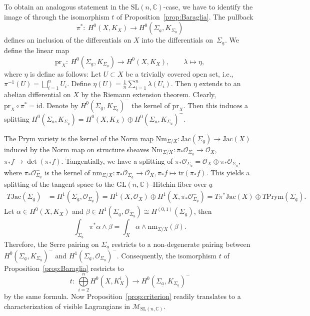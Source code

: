 \documentclass[10pt,a4paper]{amsart}
\numberwithin{equation}{section}
\theoremstyle{definition}
\newcommand{\reg}{\mathrm{reg}}
\newcommand{\Jac}{\mathrm{Jac}}
\renewcommand{\to}{\rightarrow}
\newcommand{\calB}{\mathcal{B}}
\newcommand{\calM}{\mathcal{M}}
\newcommand{\calO}{\mathcal{O}}
\newcommand{\CC}{\mathbb{C}}
\newcommand{\id}{\mathrm{id}}
\newcommand{\tr}{\mathrm{tr}}
\newcommand{\Prym}{\mathrm{Prym}}
\newcommand{\Nm}{\mathrm{Nm}}
\newcommand{\GL}{\mathrm{GL}}
\newcommand{\SL}{\mathrm{SL}}
\begin{document}
To obtain an analogous statement in the $\SL(n,\CC)$-case, we have to identify the image of \smash{$T\calB^{\reg}_{\SL(n,\CC)} \subset T\calB^{\reg}_{\GL(n,\CC)}$} through the isomorphism $t$ of Proposition~\ref{prop:Baraglia}. The pullback
\[ \pi^*\colon \ H^0(X,K_X) \rightarrow H^0({\Sigma_{\underline{a}}},K_{\Sigma_{\underline{a}}})
\]
defines an inclusion of the differentials on $X$ into the differentials on~${\Sigma_{\underline{a}}}$. We define the linear map
\[ \mathrm{pr}_X\colon \ H^0({\Sigma_{\underline{a}}},K_{\Sigma_{\underline{a}}}) \to H^0(X,K_X), \qquad \lambda \mapsto \eta,
\]
where $\eta$ is define as follows: Let $U \subset X$ be a trivially covered open set, i.e., $\pi^{-1}(U)=\bigsqcup_{i=1}^n U_i$. Define $\eta(U)= \frac1n \sum_{i=1}^n \lambda(U_i)$. Then $\eta$ extends to an abelian differential on $X$ by the Riemann extension theorem. Clearly, $\mathrm{pr}_X \circ \pi^*=\id$. Denote by $H^0({\Sigma_{\underline{a}}},K_{\Sigma_{\underline{a}}})^-$ the kernel of $\mathrm{pr}_X$. Then this induces a splitting $H^0({\Sigma_{\underline{a}}},K_{\Sigma_{\underline{a}}})=H^0(X,K_X) \oplus H^0({\Sigma_{\underline{a}}}, K_{\Sigma_{\underline{a}}})^-$.


The Prym variety is the kernel of the Norm map $\Nm_{\Sigma/X}\colon \Jac(\Sigma_{\underline{a}}) \to \Jac(X)$ induced by the Norm map on structure sheaves $\Nm_{\Sigma/X}\colon \pi_*\calO_{\Sigma_{\underline{a}}} \to \calO_X$, $\pi_*f \to \det(\pi_*f)$. Tangentially, we have a splitting of $\pi_*\calO_{\Sigma_{\underline{a}}}= \calO_X \oplus \pi_*\calO_{\Sigma_{\underline{a}}}^-$, where $\pi_*\calO_{\Sigma_{\underline{a}}}^-$ is the kernel of $\mathrm{nm}_{\Sigma/X}\colon \pi_* \calO_{\Sigma_{\underline{a}}} \to \calO_X, \pi_*f \mapsto \tr(\pi_*f)$. This yields a splitting of the tangent space to the $\GL(n,\CC)$-Hitchin fiber over $\underline{a}$
\begin{align*} T\Jac({\Sigma_{\underline{a}}})&=H^1({\Sigma_{\underline{a}}},\calO_{\Sigma_{\underline{a}}}) = H^1(X,\calO_X) \oplus H^1(X,\pi_*\calO_{\Sigma_{\underline{a}}}^-)
 = T\pi^*\Jac(X) \oplus T\Prym(\Sigma_{\underline{a}}).
\end{align*}
Let $\alpha \in H^0(X,K_X)$ and $\beta \in H^1({\Sigma_{\underline{a}}},\calO_{\Sigma_{\underline{a}}}) \cong H^{(0,1)}({\Sigma_{\underline{a}}})$, then
\[ \int_{\Sigma_{\underline{a}}} \pi^*\alpha \wedge \beta = \int_X \alpha \wedge \mathrm{nm}_{\Sigma/X} (\beta).
 \] Therefore, the Serre pairing on ${\Sigma_{\underline{a}}}$ restricts to a non-degenerate pairing between $H^0({\Sigma_{\underline{a}}},K_{\Sigma_{\underline{a}}})^-$ and $H^1({\Sigma_{\underline{a}}}, \calO_{{\Sigma_{\underline{a}}}})^-$. Consequently, the isomorphism $t$ of Proposition~\ref{prop:Baraglia} restricts to
\[ t\colon \ \bigoplus\limits_{i=2}^n H^0(X,K_X^i) \to H^0(\Sigma_{\underline{a}},K_{\Sigma_{\underline{a}}})^-
\] by the same formula.
Now Proposition~\ref{prop:criterion} readily translates to a characterization of visible Lagrangians in $\calM_{\SL(n,\CC)}$.
\end{document}
